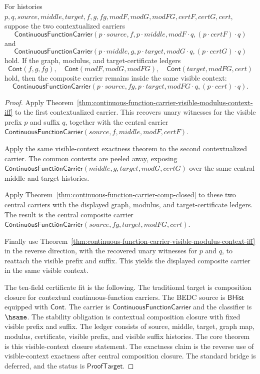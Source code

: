 \begin{theorem}
\label{thm:continuous-function-carrier-visible-modulus-context-comp-closed}
For histories $p,q,source,middle,target,f,g,fg,modF,modG,modFG,certF,certG,cert$,
suppose the two contextualized carriers
$$
\mathsf{ContinuousFunctionCarrier}(p\cdot source,f,p\cdot middle,
modF\cdot q,(p\cdot certF)\cdot q)
$$
and
$$
\mathsf{ContinuousFunctionCarrier}(p\cdot middle,g,p\cdot target,
modG\cdot q,(p\cdot certG)\cdot q)
$$
hold. If the graph, modulus, and target-certificate ledgers
$$
\mathsf{Cont}(f,g,fg),\quad
\mathsf{Cont}(modF,modG,modFG),\quad
\mathsf{Cont}(target,modFG,cert)
$$
hold, then the composite carrier remains inside the same visible context:
$$
\mathsf{ContinuousFunctionCarrier}(p\cdot source,fg,p\cdot target,
modFG\cdot q,(p\cdot cert)\cdot q).
$$
\end{theorem}
\begin{proof}
Apply Theorem~\ref{thm:continuous-function-carrier-visible-modulus-context-iff}
to the first contextualized carrier. This recovers unary witnesses for the
visible prefix $p$ and suffix $q$, together with the central carrier
$\mathsf{ContinuousFunctionCarrier}(source,f,middle,modF,certF)$.

Apply the same visible-context exactness theorem to the second contextualized
carrier. The common contexts are peeled away, exposing
$\mathsf{ContinuousFunctionCarrier}(middle,g,target,modG,certG)$ over the same
central middle and target histories.

Apply Theorem~\ref{thm:continuous-function-carrier-comp-closed} to these two
central carriers with the displayed graph, modulus, and target-certificate
ledgers. The result is the central composite carrier
$\mathsf{ContinuousFunctionCarrier}(source,fg,target,modFG,cert)$.

Finally use Theorem~\ref{thm:continuous-function-carrier-visible-modulus-context-iff}
in the reverse direction, with the recovered unary witnesses for $p$ and $q$,
to reattach the visible prefix and suffix. This yields the displayed composite
carrier in the same visible context.

The ten-field certificate fit is the following. The traditional target is
composition closure for contextual continuous-function carriers. The BEDC
source is $\mathsf{BHist}$ equipped with $\mathsf{Cont}$. The carrier is
$\mathsf{ContinuousFunctionCarrier}$ and the classifier is $\hsame$. The
stability obligation is contextual composition closure with fixed visible
prefix and suffix. The ledger consists of source, middle, target, graph map,
modulus, certificate, visible prefix, and visible suffix histories. The core
theorem is this visible-context closure statement. The exactness claim is the
reverse use of visible-context exactness after central composition closure. The
standard bridge is deferred, and the status is $\mathsf{ProofTarget}$.
\end{proof}

